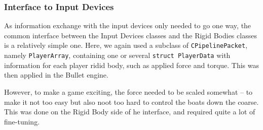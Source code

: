 \subsubsection{Interface to Input Devices}
As information exchange with the input devices only needed to go one way, the common interface between the Input Devices classes and the Rigid Bodies classes is a relatively simple one. Here, we again used a subclass of \texttt{CPipelinePacket}, namely \texttt{PlayerArray}, containing one or several \texttt{struct PlayerData} with information for each player ridid body, such as applied force and torque. This was then applied in the Bullet engine. 

However, to make a game exciting, the force needed to be scaled somewhat -- to make it not too easy but also noot too hard to control the boats down the coarse. This was done on the Rigid Body side of he interface, and required quite a lot of fine-tuning. 

%


